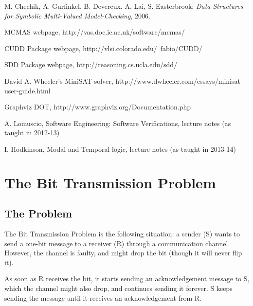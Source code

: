 \documentclass[11pt]{report}
\begin{document}
\begin{thebibliography}{9}
M. Chechik, A. Gurfinkel, B. Devereux, A. Lai, S. Easterbrook: \textit{Data Structures for Symbolic Multi-Valued Model-Checking}, 2006.

 MCMAS webpage, http://vas.doc.ic.ac.uk/software/mcmas/

 CUDD Package webpage, http://vlsi.colorado.edu/~fabio/CUDD/

 SDD Package webpage, http://reasoning.cs.ucla.edu/sdd/

 David A. Wheeler's MiniSAT solver,  http://www.dwheeler.com/essays/minisat-user-guide.html

Graphviz DOT, http://www.graphviz.org/Documentation.php

 A. Lomuscio, Software Engineering: Software Verifications, lecture notes (as taught in 2012-13)

 I. Hodkinson, Modal and Temporal logic, lecture notes (as taught in 2013-14)

\end{thebibliography}

\appendix

\chapter{The Bit Transmission Problem}
\label{BTP}
{\centering
{} }


\section{The Problem}

The Bit Transmission Problem is the following situation: a sender (S) wants to send a one-bit message to a receiver (R) through a communication channel. However, the channel is faulty, and might drop the bit (though it will never flip it). 

As soon as R receives the bit, it starts sending an acknowledgement message to S, which the channel might also drop, and continues sending it forever. S keeps sending the message until it receives an acknowledgement from R.
\end{document}
